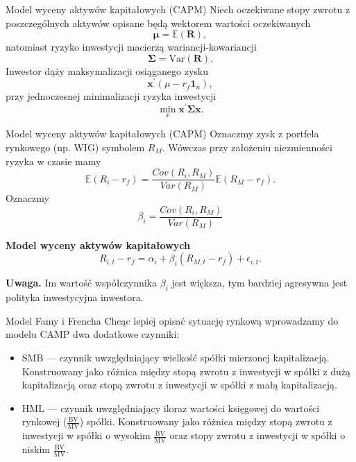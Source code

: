 \documentclass[a4paper, 11pt]{beamer}
\begin{document}
	\begin{frame}{Model wyceny aktywów kapitałowych (CAPM)}
		Niech oczekiwane stopy zwrotu z poszczególnych aktywów opisane będą 
		wektorem wartości oczekiwanych \[
			\boldsymbol{\mu} = \mathbb{E}\left(\boldsymbol{R}\right),
		\]
		natomiast ryzyko inwestycji macierzą wariancji-kowariancji \[
			\boldsymbol{\Sigma} = \mbox{Var}\left(\boldsymbol{R}\right).
		\]
		Inwestor dąży maksymalizacji osiąganego zysku \[
			{\boldsymbol{x}}^{\prime}\left(\mathbb{\mu}-r_{f}{\boldsymbol{1}}_{n}\right),
		\] przy jednoczesnej minimalizacji ryzyka inwestycji \[
			\min_{x}{\boldsymbol{x}}^{\prime}{\boldsymbol{\Sigma}}{\boldsymbol{x}}.
		\]
	\end{frame}
	
	\begin{frame}{Model wyceny aktywów kapitałowych (CAPM)}
		Oznaczmy zysk z portfela rynkowego (np. WIG) symbolem $R_M.$ Wówczas
		przy założeniu niezmienności ryzyka w czasie mamy \[
			\mathbb{E}\left(R_i - r_f\right) = \frac{Cov\left(R_i, R_M\right)}{
				Var\left(R_M\right)
			} \mathbb{E}\left(R_M - r_f\right).
		\]
		Oznaczmy \[
			\beta_i = \frac{Cov\left(R_i, R_M\right)}{Var\left(R_M\right)}
		\]
		\begin{block}{\textbf{Model wyceny aktywów kapitałowych}} \[
			R_{i,t} - r_{f} = \alpha_{i} + \beta_{i} \left(R_{M,t}-r_{f}\right) +\epsilon_{i,t}.
			\]
		\end{block}
		\begin{alert}{\textbf{Uwaga.}}
			Im wartość współczynnika $\beta_i$ jest większa, tym bardziej agresywna
			jest polityka inwestycyjna inwestora.
		\end{alert}
	\end{frame}
	
	\begin{frame}{Model Famy i Frencha}
		Chcąc lepiej opisać sytuację rynkową wprowadzamy do modelu CAMP dwa
		dodatkowe czynniki:
		\begin{itemize}
			\item SMB --- czynnik uwzględniający wielkość spółki mierzonej 
				kapitalizacją. Konstruowany jako różnica między stopą zwrotu 
				z inwestycji w spółki z dużą kapitalizacją oraz stopą zwrotu 
				z inwestycji w spółki z małą kapitalizacją.
			\item HML --- czynnik uwzględniający iloraz wartości księgowej do
				wartości rynkowej ($\frac{\mbox{BV}}{\mbox{MV}}$) spółki. 
				Konstruowany jako różnica między stopą zwrotu z inwestycji w spółki 
				o wysokim $\frac{\mbox{BV}}{\mbox{MV}}$ oraz stopy zwrotu z 		
				inwestycji w spółki o niskim $\frac{\mbox{BV}}{\mbox{MV}}.$
		\end{itemize}
	\end{frame}
	
\end{document}

